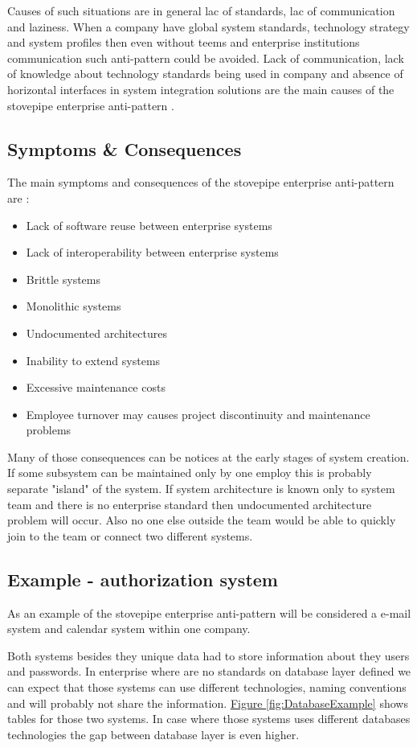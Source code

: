 Causes of such situations are in general lac of standards, lac of communication and laziness. When a company have global system standards, technology strategy and system profiles then even without teems and enterprise institutions communication such anti-pattern could be avoided. Lack of communication, lack of knowledge about technology standards being used in company and absence of horizontal interfaces in system integration solutions are the main causes of the stovepipe enterprise anti-pattern \cite{SurvivalGuide}.


\subsection{Symptoms \& Consequences}

The main symptoms and consequences of the stovepipe enterprise anti-pattern are \cite{SurvivalGuide}:
\begin{itemize}
	\item Lack of software reuse between enterprise systems
	\item Lack of interoperability between enterprise systems
	\item Brittle systems
	\item Monolithic systems
	\item Undocumented architectures
	\item Inability to extend systems
	\item Excessive maintenance costs
	\item Employee turnover may causes project discontinuity and maintenance problems
\end{itemize}
Many of those consequences can be notices at the early stages of system creation. If some subsystem can be maintained only by one employ this is probably separate "island" of the system. If system architecture is known only to system team and there is no enterprise standard then undocumented architecture problem will occur. Also no one else outside the team would be able to quickly join to the team or connect two different systems.


\subsection{Example - authorization system}

As an example of the stovepipe enterprise anti-pattern will be considered a e-mail system and calendar system within one company.

Both systems besides they unique data had to store information about they users and passwords. In enterprise where are no standards on database layer defined we can expect that those systems can use different technologies, naming conventions and will probably not share the information. 
\hyperref[fig:DatabaseExample]{Figure \ref{fig:DatabaseExample}} shows tables for those two systems. In case where those systems uses different databases technologies the gap between database layer is even higher.

